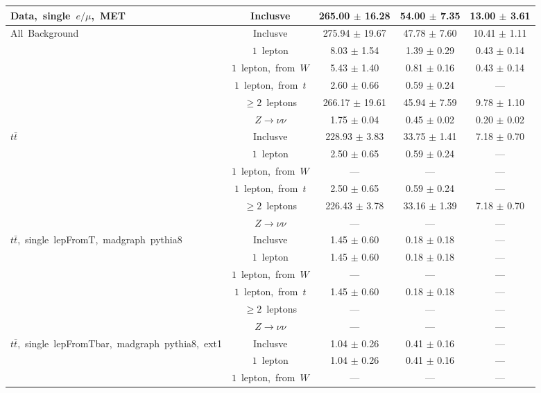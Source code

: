 \documentclass{article}
\begin{document}
\begin{longtable}{|l|c|c|c|c|}
\multirow{1}{*}{Data,~single~$e/\mu$,~MET} & Inclusve  & 265.00 $\pm$ 16.28  & 54.00 $\pm$ 7.35  & 13.00 $\pm$ 3.61 \\* 
\hline \hline 
\multirow{6}{*}{All~Background} & Inclusve  & 275.94 $\pm$ 19.67  & 47.78 $\pm$ 7.60  & 10.41 $\pm$ 1.11 \\* 
 & $1$~lepton  & 8.03 $\pm$ 1.54  & 1.39 $\pm$ 0.29  & 0.43 $\pm$ 0.14 \\* 
 & $1$~lepton,~from~$W$  & 5.43 $\pm$ 1.40  & 0.81 $\pm$ 0.16  & 0.43 $\pm$ 0.14 \\* 
 & $1$~lepton,~from~$t$  & 2.60 $\pm$ 0.66  & 0.59 $\pm$ 0.24  & --- \\* 
 & $\ge2$~leptons  & 266.17 $\pm$ 19.61  & 45.94 $\pm$ 7.59  & 9.78 $\pm$ 1.10 \\* 
 & $Z\rightarrow\nu\nu$  & 1.75 $\pm$ 0.04  & 0.45 $\pm$ 0.02  & 0.20 $\pm$ 0.02 \\* 
\hline 
\multirow{6}{*}{$t\bar{t}$} & Inclusve  & 228.93 $\pm$ 3.83  & 33.75 $\pm$ 1.41  & 7.18 $\pm$ 0.70 \\* 
 & $1$~lepton  & 2.50 $\pm$ 0.65  & 0.59 $\pm$ 0.24  & --- \\* 
 & $1$~lepton,~from~$W$  & ---  & ---  & --- \\* 
 & $1$~lepton,~from~$t$  & 2.50 $\pm$ 0.65  & 0.59 $\pm$ 0.24  & --- \\* 
 & $\ge2$~leptons  & 226.43 $\pm$ 3.78  & 33.16 $\pm$ 1.39  & 7.18 $\pm$ 0.70 \\* 
 & $Z\rightarrow\nu\nu$  & ---  & ---  & --- \\* 
\hline 
\multirow{6}{*}{$t\bar{t}$,~single~lepFromT,~madgraph~pythia8} & Inclusve  & 1.45 $\pm$ 0.60  & 0.18 $\pm$ 0.18  & --- \\* 
 & $1$~lepton  & 1.45 $\pm$ 0.60  & 0.18 $\pm$ 0.18  & --- \\* 
 & $1$~lepton,~from~$W$  & ---  & ---  & --- \\* 
 & $1$~lepton,~from~$t$  & 1.45 $\pm$ 0.60  & 0.18 $\pm$ 0.18  & --- \\* 
 & $\ge2$~leptons  & ---  & ---  & --- \\* 
 & $Z\rightarrow\nu\nu$  & ---  & ---  & --- \\* 
\hline 
\multirow{6}{*}{$t\bar{t}$,~single~lepFromTbar,~madgraph~pythia8,~ext1} & Inclusve  & 1.04 $\pm$ 0.26  & 0.41 $\pm$ 0.16  & --- \\* 
 & $1$~lepton  & 1.04 $\pm$ 0.26  & 0.41 $\pm$ 0.16  & --- \\* 
 & $1$~lepton,~from~$W$  & ---  & ---  & --- \\* 

\end{longtable}
\end{document}

